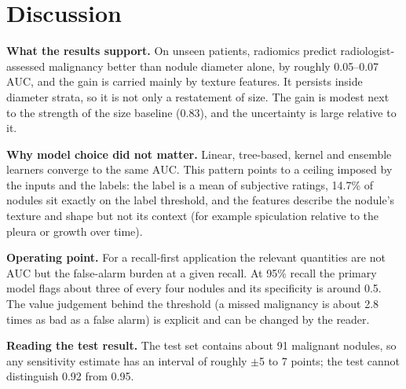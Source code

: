 \documentclass[journal]{IEEEtran}
\newcommand{\auc}{\mathrm{AUC}}
\begin{document}
\section{Discussion}
\label{sec:discussion}
\textbf{What the results support.} On unseen patients, radiomics predict radiologist-assessed malignancy better than
nodule diameter alone, by roughly 0.05--0.07 $\auc$, and the gain is carried mainly by texture features. It persists inside
diameter strata, so it is not only a restatement of size. The gain is modest next to the strength of the size baseline
(0.83), and the uncertainty is large relative to it.

\textbf{Why model choice did not matter.} Linear, tree-based, kernel and ensemble learners converge to the same $\auc$.
This pattern points to a ceiling imposed by the inputs and the labels: the label is a mean of subjective ratings, 14.7\% of
nodules sit exactly on the label threshold, and the features describe the nodule's texture and shape but not its context
(for example spiculation relative to the pleura or growth over time).

\textbf{Operating point.} For a recall-first application the relevant quantities are not $\auc$ but the false-alarm
burden at a given recall. At 95\% recall the primary model flags about three of every four nodules and its specificity
is around 0.5. The value judgement behind the threshold (a missed malignancy is about 2.8 times as bad as a false
alarm) is explicit and can be changed by the reader.

\textbf{Reading the test result.} The test set contains about 91 malignant nodules, so any sensitivity estimate has an
interval of roughly $\pm$5 to 7 points; the test cannot distinguish 0.92 from 0.95.

\end{document}
